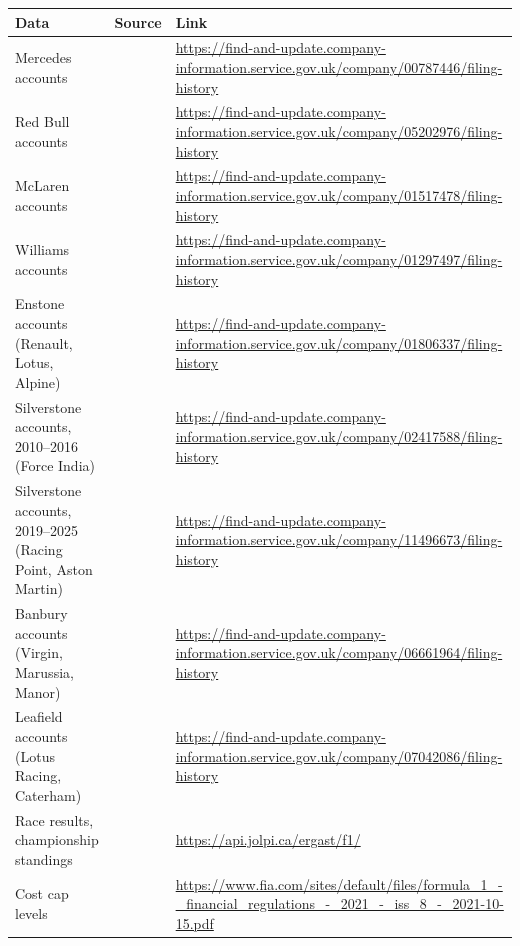\documentclass[11pt,a4paper]{article}
\begin{document}
\begin{table}[htbp]
\centering
\footnotesize
\renewcommand{\arraystretch}{1.25}
\begin{tabularx}{\textwidth}{@{}>{\raggedright\arraybackslash}p{3.6cm}>{\raggedright\arraybackslash}p{3.4cm}>{\raggedright\arraybackslash}X@{}}
\toprule
Data & Source & Link \\
\midrule
Mercedes accounts & \citet{ch_mercedes} & \url{https://find-and-update.company-information.service.gov.uk/company/00787446/filing-history} \\
Red Bull accounts & \citet{ch_redbull} & \url{https://find-and-update.company-information.service.gov.uk/company/05202976/filing-history} \\
McLaren accounts & \citet{ch_mclaren} & \url{https://find-and-update.company-information.service.gov.uk/company/01517478/filing-history} \\
Williams accounts & \citet{ch_williams} & \url{https://find-and-update.company-information.service.gov.uk/company/01297497/filing-history} \\
Enstone accounts (Renault, Lotus, Alpine) & \citet{ch_enstone} & \url{https://find-and-update.company-information.service.gov.uk/company/01806337/filing-history} \\
Silverstone accounts, 2010--2016 (Force India) & \citet{ch_forceindia} & \url{https://find-and-update.company-information.service.gov.uk/company/02417588/filing-history} \\
Silverstone accounts, 2019--2025 (Racing Point, Aston Martin) & \citet{ch_amr} & \url{https://find-and-update.company-information.service.gov.uk/company/11496673/filing-history} \\
Banbury accounts (Virgin, Marussia, Manor) & \citet{ch_manor} & \url{https://find-and-update.company-information.service.gov.uk/company/06661964/filing-history} \\
Leafield accounts (Lotus Racing, Caterham) & \citet{ch_caterham} & \url{https://find-and-update.company-information.service.gov.uk/company/07042086/filing-history} \\
\addlinespace
Race results, championship standings & \citet{jolpica} & \url{https://api.jolpi.ca/ergast/f1/} \\
Cost cap levels & \citet{fia2021} & \url{https://www.fia.com/sites/default/files/formula_1_-_financial_regulations_-_2021_-_iss_8_-_2021-10-15.pdf} \\
\bottomrule
\end{tabularx}
\end{table}
\end{document}

